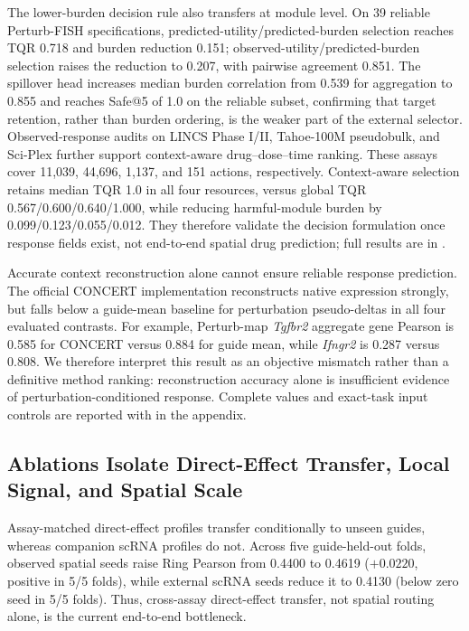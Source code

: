 \documentclass[sigconf,review,balance=false]{acmart}
\begin{document}
The lower-burden decision rule also transfers at module level. On 39 reliable
Perturb-FISH specifications, predicted-utility/predicted-burden selection
reaches TQR 0.718 and burden reduction 0.151; observed-utility/predicted-burden
selection raises the reduction to 0.207, with pairwise agreement 0.851.
The spillover head increases median burden correlation from 0.539 for
aggregation to 0.855 and reaches Safe@5 of 1.0 on the reliable subset,
confirming that target retention, rather than burden ordering, is the weaker
part of the external selector.
Observed-response audits on LINCS Phase I/II, Tahoe-100M pseudobulk, and
Sci-Plex further support context-aware drug--dose--time ranking. These assays
cover 11,039, 44,696, 1,137, and 151 actions, respectively. Context-aware
selection retains median TQR 1.0 in all four resources, versus global TQR
0.567/0.600/0.640/1.000, while reducing harmful-module burden by
0.099/0.123/0.055/0.012. They therefore validate the decision formulation once
response fields exist, not end-to-end spatial drug prediction; full results
are in .

Accurate context reconstruction alone cannot ensure reliable response
prediction. The official CONCERT implementation reconstructs native expression
strongly, but falls below a guide-mean baseline for perturbation pseudo-deltas
in all four evaluated contrasts. For example, Perturb-map \textit{Tgfbr2}
aggregate gene Pearson is 0.585 for CONCERT versus 0.884 for guide mean, while
\textit{Ifngr2} is 0.287 versus 0.808. We therefore interpret this result as an
objective mismatch rather than a definitive method ranking: reconstruction
accuracy alone is insufficient evidence of perturbation-conditioned response.
Complete values and exact-task input controls are reported with
 in the appendix.

\subsection{Ablations Isolate Direct-Effect Transfer, Local Signal, and Spatial Scale}
\label{sec:ablations}
\label{sec:signal_decomposition}
Assay-matched direct-effect profiles transfer conditionally to unseen guides,
whereas companion scRNA profiles do not. Across five guide-held-out folds,
observed spatial seeds raise Ring Pearson from 0.4400 to 0.4619
($+0.0220$, positive in 5/5 folds), while external scRNA seeds reduce it to
0.4130 (below zero seed in 5/5 folds). Thus, cross-assay direct-effect transfer,
not spatial routing alone, is the current end-to-end bottleneck.
\end{document}
